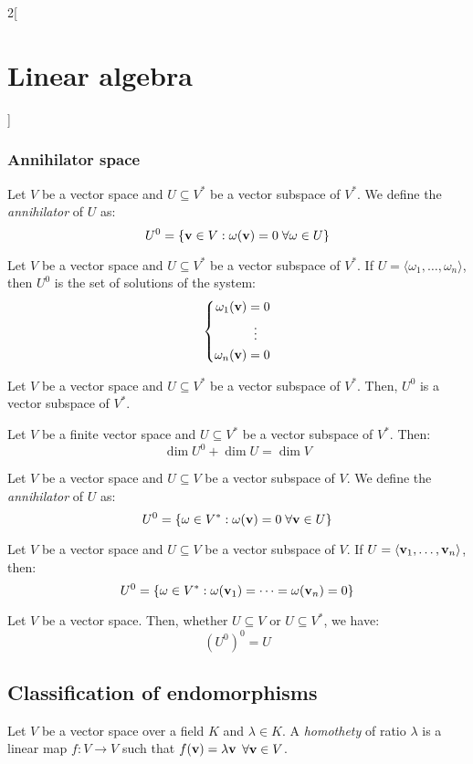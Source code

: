 \documentclass[../../../main_math.tex]{subfiles}
\begin{document}
\begin{multicols}{2}[\section{Linear algebra}]
  \subsubsection{Annihilator space}
  \begin{definition}
    Let $V$ be a vector space and $U\subseteq V^*$ be a vector subspace of $V^*$. We define the \emph{annihilator} of $U$ as:
    $$U^0=\{\boldsymbol{\mathrm{v}}\in V:\omega(\boldsymbol{\mathrm{v}})=0\;\forall\omega\in U\}$$
  \end{definition}
  \begin{lemma}
    Let $V$ be a vector space and $U\subseteq V^*$ be a vector subspace of $V^*$. If $U=\langle\omega_1,\ldots,\omega_n\rangle$, then $U^0$ is the set of solutions of the system:
    $$\left\{
      \begin{aligned}
        \omega_1(\boldsymbol{\mathrm{v}}) & =0         \\
                         & \;\;\vdots \\
        \omega_n(\boldsymbol{\mathrm{v}}) & =0
      \end{aligned}
      \right.
    $$
  \end{lemma}
  \begin{lemma}
    Let $V$ be a vector space and $U\subseteq V^*$ be a vector subspace of $V^*$. Then, $U^0$ is a vector subspace of $V^*$.
  \end{lemma}
  \begin{theorem}
    Let $V$ be a finite vector space and $U\subseteq V^*$ be a vector subspace of $V^*$. Then: $$\dim U^0+\dim U=\dim V$$
  \end{theorem}
  \begin{definition}
    Let $V$ be a vector space and $U\subseteq V$ be a vector subspace of $V$. We define the \emph{annihilator} of $U$ as:
    $$U^0=\{\omega\in V^*:\omega(\boldsymbol{\mathrm{v}})=0\;\forall\boldsymbol{\mathrm{v}}\in U\}$$
  \end{definition}
  \begin{lemma}
    Let $V$ be a vector space and $U\subseteq V$  be a vector subspace of $V$. If $U=\langle\boldsymbol{\mathrm{v}}_1,\ldots,\boldsymbol{\mathrm{v}}_n\rangle$, then: $$U^0=\{\omega\in V^*:\omega(\boldsymbol{\mathrm{v}}_1)=\cdots=\omega(\boldsymbol{\mathrm{v}}_n)=0\}$$
  \end{lemma}
  \begin{proposition}
    Let $V$ be a vector space. Then, whether $U\subseteq V$ or $U\subseteq V^*$, we have: $${(U^0)}^0=U$$
  \end{proposition}
  \subsection{Classification of endomorphisms}
  \begin{definition}
    Let $V$ be a vector space over a field $K$ and $\lambda\in K$. A \emph{homothety} of ratio $\lambda$ is a linear map $f:V\rightarrow V$ such that $f(\boldsymbol{\mathrm{v}})=\lambda\boldsymbol{\mathrm{v}}$ $\forall\boldsymbol{\mathrm{v}}\in V$.
  \end{definition}

\end{multicols}
\end{document}
